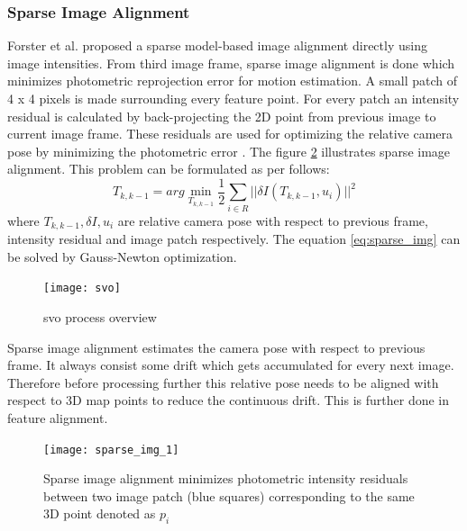 \subsubsection{Sparse Image Alignment}
Forster et al. proposed a sparse model-based image alignment directly using image intensities. From third image frame, sparse image alignment is done which minimizes photometric reprojection error for motion estimation. A small patch of 4 x 4 pixels is made surrounding every feature point. For every patch an intensity residual is calculated by back-projecting the 2D point from previous image to current image frame. These residuals are used for optimizing the relative camera pose by minimizing the photometric error \cite{Forster2014ICRA}. The figure \ref{fig:sparse_img_1} illustrates sparse image alignment. This problem can be formulated as per follows:
\begin{equation*}
T_{k,k-1} = arg \min\limits_{T_{k,k-1}} \frac{1}{2} \sum\limits_{i \in R} || \delta I (T_{k,k-1}, u_{i})||^{2}
\label{eq:sparse_img}
\end{equation*}
\noindent where $T_{k,k-1}, \delta I, u_{i} $ are relative camera pose with respect to previous frame, intensity residual and image patch respectively. The equation \ref{eq:sparse_img} can be solved by Gauss-Newton optimization. \\
\begin{figure}[H]
	\centering
	\texttt{[image: svo]}
	\caption{\acrshort{svo} process overview \cite{Forster2014ICRA}}
	\label{fig:svo}
\end{figure}
\noindent Sparse image alignment estimates the camera pose with respect to previous frame. It always consist some drift which gets accumulated for every next image. Therefore before processing further this relative pose needs to be aligned with respect to 3D map points to reduce the continuous drift. This is further done in feature alignment.
\begin{figure}[h!]
	\centering
	\texttt{[image: sparse\_img\_1]}
	\caption{Sparse image alignment minimizes photometric intensity residuals between two image patch (blue squares) corresponding to the same 3D point denoted as $ p_{i}$ \cite{Forster2014ICRA}}
	\label{fig:sparse_img_1}
\end{figure}
